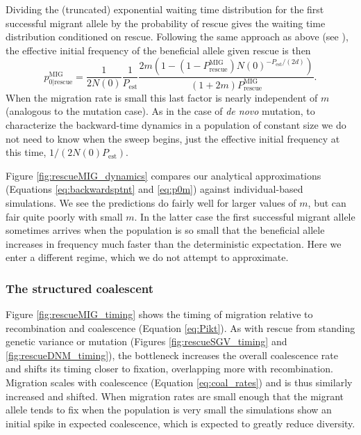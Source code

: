 \documentclass[]{article}
\begin{document}
Dividing the (truncated) exponential waiting time distribution for the first successful migrant allele by the probability of rescue gives the waiting time distribution conditioned on rescue.
Following the same approach as above (see ), the effective initial frequency of the beneficial allele given rescue is then
\begin{equation}\label{eq:p0m}
p_{0|\mathrm{rescue}}^\mathrm{MIG} = \frac{1}{2N(0)}\frac{1}{P_\mathrm{est}}\frac{2m \left( 1 - (1-P_\mathrm{rescue}^\mathrm{MIG})  N(0)^{-P_\mathrm{est}/(2d)} \right)}{(1+2m)P_\mathrm{rescue}^\mathrm{MIG}}.
\end{equation}
When the migration rate is small this last factor is nearly independent of $m$ (analogous to the mutation case).
As in the case of \textit{de novo} mutation, to characterize the backward-time dynamics in a population of constant size we do not need to know when the sweep begins, just the effective initial frequency at this time, $1/(2N(0)P_\mathrm{est})$.

Figure \ref{fig:rescueMIG_dynamics} compares our analytical approximations (Equations \ref{eq:backwardsptnt} and \ref{eq:p0m}) against individual-based simulations.
We see the predictions do fairly well for larger values of $m$, but can fair quite poorly with small $m$.
In the latter case the first successful migrant allele sometimes arrives when the population is so small that the beneficial allele increases in frequency much faster than the deterministic expectation.
Here we enter a different regime, which we do not attempt to approximate.

\subsubsection*{The structured coalescent}

Figure \ref{fig:rescueMIG_timing} shows the timing of migration relative to recombination and coalescence (Equation \ref{eq:Pikt}).
As with rescue from standing genetic variance or mutation (Figures \ref{fig:rescueSGV_timing} and \ref{fig:rescueDNM_timing}), the bottleneck increases the overall coalescence rate and shifts its timing closer to fixation, overlapping more with recombination. 
Migration scales with coalescence (Equation \ref{eq:coal_rates}) and is thus similarly increased and shifted.
When migration rates are small enough that the migrant allele tends to fix when the population is very small the simulations show an initial spike in expected coalescence, which is expected to greatly reduce diversity.
\end{document}
